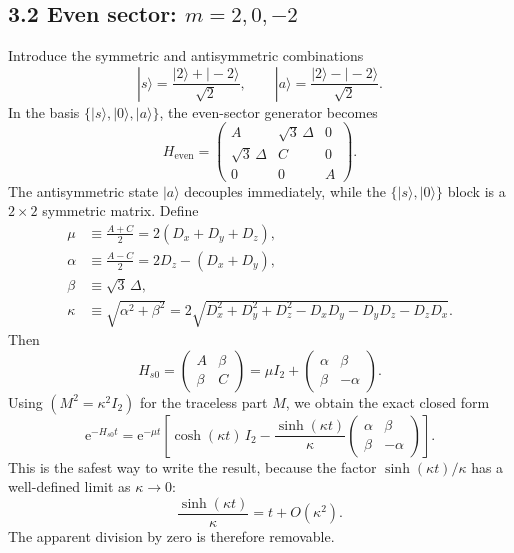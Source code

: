 \documentclass[11pt]{article}
\newcommand{\e}{\mathrm{e}}
\begin{document}
\subsection*{3.2 Even sector: $m=2,0,-2$}

Introduce the symmetric and antisymmetric combinations
\begin{equation}
|s\rangle=\frac{|2\rangle+|-2\rangle}{\sqrt{2}},
\qquad
|a\rangle=\frac{|2\rangle-|-2\rangle}{\sqrt{2}}.
\end{equation}
In the basis $\{|s\rangle,|0\rangle,|a\rangle\}$, the even-sector generator becomes
\begin{equation}
H_{\mathrm{even}}=
\begin{pmatrix}
A & \sqrt{3}\,\Delta & 0\\
\sqrt{3}\,\Delta & C & 0\\
0 & 0 & A
\end{pmatrix}.
\end{equation}
The antisymmetric state $|a\rangle$ decouples immediately, while the $\{|s\rangle,|0\rangle\}$ block is a $2\times2$ symmetric matrix.  Define
\begin{align}
\mu &\equiv \frac{A+C}{2}=2(D_x+D_y+D_z),\\
\alpha &\equiv \frac{A-C}{2}=2D_z-(D_x+D_y),\\
\beta &\equiv \sqrt{3}\,\Delta,\\
\kappa &\equiv \sqrt{\alpha^2+\beta^2}
=2\sqrt{D_x^2+D_y^2+D_z^2-D_xD_y-D_yD_z-D_zD_x}.
\end{align}
Then
\begin{equation}
H_{s0}=
\begin{pmatrix}
A & \beta\\
\beta & C
\end{pmatrix}
=\mu I_2+
\begin{pmatrix}
\alpha & \beta\\
\beta & -\alpha
\end{pmatrix}.
\end{equation}
Using $(M^2=\kappa^2 I_2)$ for the traceless part $M$, we obtain the exact closed form
\begin{equation}
\e^{-H_{s0}t}
=
\e^{-\mu t}
\left[
\cosh(\kappa t)\,I_2
-
\frac{\sinh(\kappa t)}{\kappa}
\begin{pmatrix}
\alpha & \beta\\
\beta & -\alpha
\end{pmatrix}
\right].
\label{eq:hs0exp}
\end{equation}
This is the safest way to write the result, because the factor $\sinh(\kappa t)/\kappa$ has a well-defined limit as $\kappa\to 0$:
\begin{equation}
\frac{\sinh(\kappa t)}{\kappa}=t+O(\kappa^2).
\end{equation}
The apparent division by zero is therefore removable.
\end{document}
